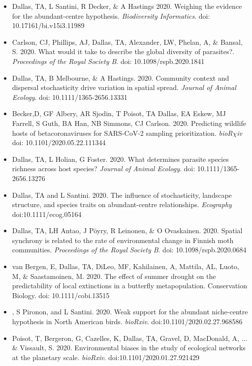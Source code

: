 \documentclass[]{CV}
\begin{document}
\begin{itemize}

\item {\mefont Dallas, TA}, L Santini, R Decker, \& A Hastings 2020. Weighing the evidence for the abundant-centre hypothesis. \textit{Biodiversity Informatics}. doi: 10.17161/bi.v15i3.11989 

\item Carlson, CJ, Phillips, AJ, {\mefont Dallas, TA}, Alexander, LW, Phelan, A, \& Bansal, S. 2020. What would it take to describe the global diversity of parasites?. \textit{Proceedings of the Royal Society B}. doi: 10.1098/rspb.2020.1841

\item {\mefont Dallas, TA}, B Melbourne, \& A Hastings. 2020. Community context and dispersal stochasticity drive variation in spatial spread. \textit{Journal of Animal Ecology}. doi: 10.1111/1365-2656.13331

\item Becker,D, GF Albery, AR Sjodin, T Poisot, {\mefont TA Dallas}, EA Eskew, MJ Farrell, S Guth, BA Han, NB Simmons, CJ Carlson. 2020. Predicting wildlife hosts of betacoronaviruses for SARS-CoV-2 sampling prioritization. \textit{bioR$\chi$iv} doi: 10.1101/2020.05.22.111344 

\item {\mefont Dallas, TA}, L Holian, G Foster. 2020. What determines parasite species richness across host species? \textit{Journal of Animal Ecology}. doi: 10.1111/1365-2656.13276

\item {\mefont Dallas, TA} and L Santini. 2020. The influence of stochasticity, landscape structure, and species traits on abundant-centre relationships. \textit{Ecography} doi:10.1111/ecog.05164

\item {\mefont Dallas, TA}, LH Antao, J Pöyry, R Leinonen, \& O Ovaskainen. 2020. Spatial synchrony is related to the rate of environmental change in Finnish moth communities. \textit{Proceedings of the Royal Society B}. doi: 10.1098/rspb.2020.0684

\item van Bergen, E, {\mefont Dallas, TA}, DiLeo, MF, Kahilainen, A, Mattila, AL, Luoto, M, \& Saastamoinen, M. 2020. The effect of summer drought on the predictability of local extinctions in a butterfly metapopulation. Conservation Biology. doi: 10.1111/cobi.13515

\item {}, S Pironon, and L Santini. 2020. Weak support for the abundant niche-centre hypothesis in North American birds. \textit{bioRxiv}. doi:10.1101/2020.02.27.968586

\item \OA Poisot, T, Bergeron, G, Cazelles, K, {\mefont Dallas, TA}, Gravel, D, MacDonald, A, ... \& Vissault, S. 2020. Environmental biases in the study of ecological networks at the planetary scale. \textit{bioRxiv}. doi:10.1101/2020.01.27.921429

\end{itemize}
\end{document}
